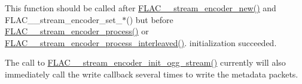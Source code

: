 This function should be called after \mbox{\hyperlink{group__flac__stream__encoder_ga35f3d94452bcf0a90a31c7d770b200bc}{F\+L\+A\+C\+\_\+\+\_\+stream\+\_\+encoder\+\_\+new()}} and F\+L\+A\+C\+\_\+\+\_\+stream\+\_\+encoder\+\_\+set\+\_\+$\ast$() but before \mbox{\hyperlink{group__flac__stream__encoder_gae187ec4f6cab3ca109637996ee23272d}{F\+L\+A\+C\+\_\+\+\_\+stream\+\_\+encoder\+\_\+process()}} or \mbox{\hyperlink{group__flac__stream__encoder_ga67c2ff5b23b945180797de420b1f27c0}{F\+L\+A\+C\+\_\+\+\_\+stream\+\_\+encoder\+\_\+process\+\_\+interleaved()}}. initialization succeeded.

The call to \mbox{\hyperlink{group__flac__stream__encoder_ga87af71d74c09f7d482f9f420ef9bf826}{F\+L\+A\+C\+\_\+\+\_\+stream\+\_\+encoder\+\_\+init\+\_\+ogg\+\_\+stream()}} currently will also immediately call the write callback several times to write the metadata packets.


